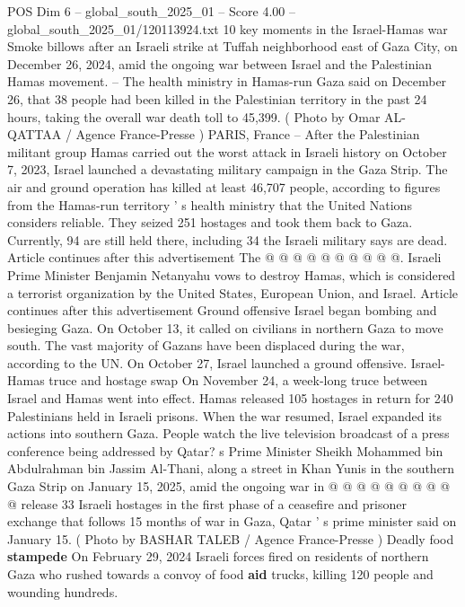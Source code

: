 \begin{textsample}{POS Dim 6 – global\_south\_2025\_01 – Score 4.00 – global\_south\_2025\_01/120113924.txt}  \label{ex:f6_pos_358}
10 key moments in the Israel-Hamas war Smoke billows after an Israeli strike at Tuffah neighborhood east of Gaza City, on December 26, 2024, amid the ongoing war between Israel and the Palestinian Hamas movement. -- The health ministry in Hamas-run Gaza said on December 26, that 38 people had been killed in the Palestinian territory in the past 24 hours, taking the overall war death toll to 45,399. ( Photo by Omar AL-QATTAA / Agence France-Presse ) PARIS, France -- After the Palestinian militant group Hamas carried out the worst attack in Israeli history on October 7, 2023, Israel launched a devastating military campaign in the Gaza Strip.
The air and ground operation has killed at least 46,707 people, according to figures from the Hamas-run territory ' s health ministry that the United Nations considers reliable.
They seized 251 hostages and took them back to Gaza.
Currently, 94 are still held there, including 34 the Israeli military says are dead.
Article continues after this advertisement The @ @ @ @ @ @ @ @ @ @.
Israeli Prime Minister Benjamin Netanyahu vows to destroy Hamas, which is considered a terrorist organization by the United States, European Union, and Israel.
Article continues after this advertisement Ground offensive Israel began bombing and besieging Gaza.
On October 13, it called on civilians in northern Gaza to move south.
The vast majority of Gazans have been displaced during the war, according to the UN.
On October 27, Israel launched a ground offensive.
Israel-Hamas truce and hostage swap On November 24, a week-long truce between Israel and Hamas went into effect.
Hamas released 105 hostages in return for 240 Palestinians held in Israeli prisons.
When the war resumed, Israel expanded its actions into southern Gaza.
People watch the live television broadcast of a press conference being addressed by Qatar? s Prime Minister Sheikh Mohammed bin Abdulrahman bin Jassim Al-Thani, along a street in Khan Yunis in the southern Gaza Strip on January 15, 2025, amid the ongoing war in @ @ @ @ @ @ @ @ @ @ release 33 Israeli hostages in the first phase of a ceasefire and prisoner exchange that follows 15 months of war in Gaza, Qatar ' s prime minister said on January 15. ( Photo by BASHAR TALEB / Agence France-Presse ) Deadly food \textbf{stampede} On February 29, 2024 Israeli forces fired on residents of northern Gaza who rushed towards a convoy of food \textbf{aid} trucks, killing 120 people and wounding hundreds.

\end{textsample}
